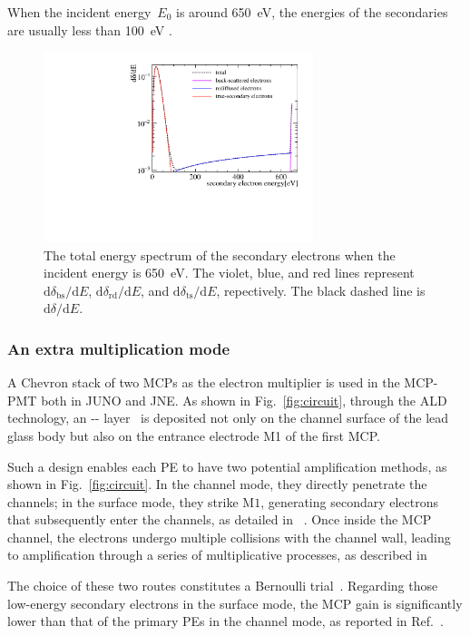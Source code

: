 When the incident energy~$E_0$ is around \SI{650}{eV}, the energies of the secondaries are usually less than \SI{100}{eV} .
\begin{figure}[!htbp]
	\centering
	\includegraphics[width=0.7\textwidth]{PMTRelated/GTmodel/SES.pdf}
	\caption{The total energy spectrum of the secondary electrons when the incident energy is \SI{650}{eV}.
		The violet, blue, and red lines represent $\mathrm{d}\delta_{\mathrm{bs}}/\mathrm{d}E$, $\mathrm{d}\delta_{\mathrm{rd}}/\mathrm{d}E$, and
		$\mathrm{d}\delta_{\mathrm{ts}}/\mathrm{d}E$, repectively.
		The black dashed line is $\mathrm{d}\delta/\mathrm{d}E$.}
	\label{fig:SES}
\end{figure}

\subsubsection{An extra multiplication mode}
A Chevron stack of two MCPs as the electron multiplier is used in the MCP-PMT both in JUNO and JNE.
As shown in Fig.~\ref{fig:circuit}, through the ALD technology, an -- layer~\cite{zzj2021Al} is deposited not only on the channel surface of the lead glass body
but also on the entrance electrode M1 of the first MCP.

Such a design enables each PE to have two potential amplification methods, as shown in Fig.~\ref{fig:circuit}.
In the channel mode, they directly penetrate the channels; in the surface mode, they strike $\mathrm{M}1$, generating secondary electrons that subsequently enter the channels, as detailed in ~\cite{2016Optimization}. Once inside the MCP channel, the electrons undergo multiple collisions with the channel wall, leading to amplification through a series of multiplicative processes, as described in~\cite{1955Scintillation}

The choice of these two routes constitutes a Bernoulli trial~\cite{1955Scintillation}. Regarding those low-energy secondary electrons in the surface mode, the MCP gain is significantly lower than that of the primary PEs in the channel mode, as reported in Ref.~\cite{2012An}.

